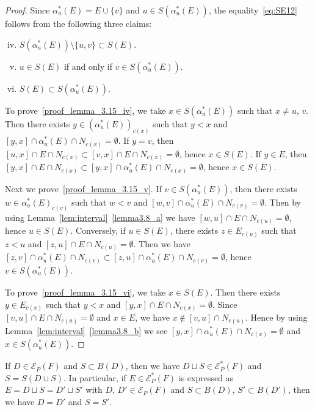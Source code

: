 \documentclass[ALCO,ThmDefs,Unicode,epreuves]{cedram}
\newcommand\EE{\mathcal{E}}
\begin{document}
\begin{proof}
Since $\alpha^*_u(E) = E \cup \{ v \}$ and 
$u\in S(\alpha^*_u(E))$, the equality~\eqref{eq:SE12} 
follows from the following three claims:
\begin{enumerate}[(i)]\setcounter{enumi}{3}
\item\label{proof_lemma_3.15_iv} %
$S(\alpha^*_u(E)) \setminus \{ u, v \} \subset S(E)$.
\item\label{proof_lemma_3.15_v} %
$u \in S(E)$ if and only if $v \in S(\alpha^*_u(E))$.
\item\label{proof_lemma_3.15_vi} %
$S(E) \subset S(\alpha^*_u(E))$.
\end{enumerate}

To prove~\ref{proof_lemma_3.15_iv}, we take $x \in S(\alpha^*_u(E))$ such that $x \neq u$, $v$.
Then there exists $y \in (\alpha^*_u(E))_{c(x)}$ such that $y<x$ 
and $[y,x] \cap \alpha^*_u(E) \cap N_{c(x)} = \emptyset$.
If $y = v$, then $[u,x] \cap E \cap N_{c(x)} \subset [v,x] \cap E \cap N_{c(x)} = \emptyset$, 
hence $x \in S(E)$.
If $y \in E$, then $[y,x] \cap E \cap N_{c(x)} \subset [y,x] \cap \alpha^*_u(E) \cap N_{c(x)} = \emptyset$, 
hence $x \in S(E)$.

Next we prove~\ref{proof_lemma_3.15_v}.
If $v \in S(\alpha^{*}_u(E))$, then there exists $w \in \alpha^*_u(E)_{c(v)}$ such that
$w<v$ and $[w,v] \cap \alpha^*_u(E) \cap N_{c(v)} = \emptyset$.
Then by using Lemma~\ref{lem:interval}~\ref{lemma3.8_a} we have $[w,u] \cap E \cap N_{c(u)} = \emptyset$, 
hence $u \in S(E)$.
Conversely, if $u \in S(E)$, there exists $z \in E_{c(u)}$ such that $z<u$ and 
$[z,u] \cap E \cap N_{c(u)} = \emptyset$.
Then we have $[z,v] \cap \alpha^*_u(E) \cap N_{c(v)} \subset [z,u] \cap \alpha^*_u(E) \cap N_{c(v)} = \emptyset$, 
hence $v \in S(\alpha^*_u(E))$.

To prove~\ref{proof_lemma_3.15_vi}, we take $x \in S(E)$.
Then there exists $y \in E_{c(x)}$ such that $y < x$ and $[y,x] \cap E \cap N_{c(x)} = \emptyset$.
Since $[v,u] \cap E \cap N_{c(u)} = \emptyset$ and $x \in E$, we have $x \not\in [v,u] \cap N_{c(u)}$.
Hence by using Lemma~\ref{lem:interval}~\ref{lemma3.8_b} we see $[y,x] \cap \alpha^*_u(E) \cap N_{c(x)} = \emptyset$ 
and $x \in S(\alpha^*_u(E))$.
\end{proof}

\begin{lemm}
\label{lem:SE2}
If $D \in \EE_P(F)$ and $S \subset B(D)$, 
then we have $D \sqcup S \in \EE^*_P(F)$ and $S = S(D \sqcup S)$.
In particular, if $E \in \EE^*_P(F)$ is expressed as $E = D \sqcup S = D' \sqcup S'$ 
with $D$, $D' \in \EE_P(F)$ and $S \subset B(D)$, $S' \subset B(D')$, then we have 
$D = D'$ and $S = S'$.
\end{lemm}
\end{document}
